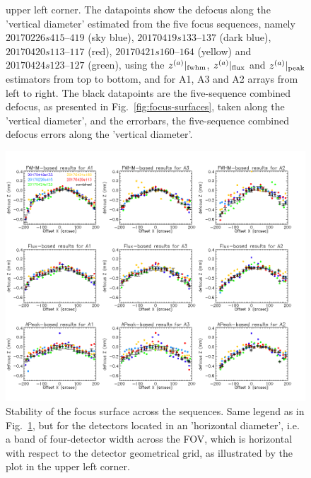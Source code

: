 \begin{figure}
{    upper left corner. The datapoints show the defocus along the
    'vertical diameter' estimated from the five focus sequences,
    namely $20170226s415\mbox{--}419$ (sky blue),
    $20170419s133\mbox{--}137$ (dark blue), $20170420s113\mbox{--}117$ (red),
    $20170421s160\mbox{--}164$ (yellow) and $20170424s123\mbox{--}127$
    (green), using the $z^{(a)}|_{\rm{fwhm}}$, $z^{(a)}|_{\rm{flux}}$ and
    $z^{(a)}|_{\rm{peak}}$ estimators from top to bottom, and for A1, A3 and
    A2 arrays from left to right. The black datapoints are the five-sequence combined defocus, as
    presented in Fig.~\ref{fig:focus-surfaces}, taken along the
    'vertical diameter', and the errorbars, the
    five-sequence combined defocus errors along the 'vertical
    diameter'.}
\label{fig:focus-stability-H}
\end{figure}


\begin{figure}  
  \begin{center}
  \includegraphics[trim={0, 2cm, 0, 2cm},clip, angle=0, scale=0.45]{Figures/fov_focus_1D_Hband_5.png}
  \caption{Stability of the focus surface across the sequences. Same
    legend as in Fig.~\ref{fig:focus-stability-H}, but for the
    detectors located in an 'horizontal diameter', i.e. a band of
    four-detector width across the FOV, which is horizontal with respect to
    the detector geometrical grid, as illustrated by the plot in the
    upper left corner. }
\label{fig:focus-stability-V}
\end{center}
\end{figure}


